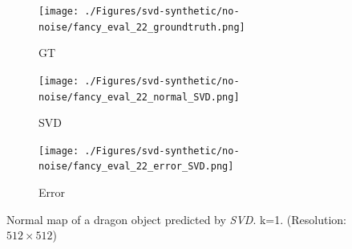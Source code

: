 \begin{figure}[th]
	\centering
	\captionsetup{width=\linewidth}
	\begin{subfigure}[b]{0.32\linewidth}
		\texttt{[image: ./Figures/svd-synthetic/no-noise/fancy\_eval\_22\_groundtruth.png]}
		\caption{GT}
	\end{subfigure}
	\begin{subfigure}[b]{0.32\linewidth}
		\texttt{[image: ./Figures/svd-synthetic/no-noise/fancy\_eval\_22\_normal\_SVD.png]}
		\caption{SVD}
	\end{subfigure}
	\begin{subfigure}[b]{0.32\linewidth}
		\texttt{[image: ./Figures/svd-synthetic/no-noise/fancy\_eval\_22\_error\_SVD.png]}
		\caption{Error}
	\end{subfigure}
	
	\decoRule
	\caption{Normal map of a dragon object predicted by \textit{SVD}. k=1. (Resolution: $ 512\times 512 $) }
	\label{fig:svd-normal}
\end{figure}

